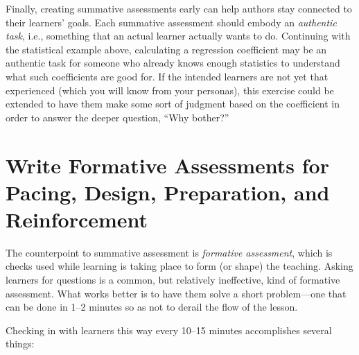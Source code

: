 \documentclass[10pt,letterpaper]{article}
\newcommand{\rulemajor}[1]{\section{#1}}
\begin{document}
Finally, creating summative assessments early can help authors stay connected to
their learners' goals.  Each summative assessment should embody an
\emph{authentic task}, i.e., something that an actual learner actually wants to
do.  Continuing with the statistical example above, calculating a regression
coefficient may be an authentic task for someone who already knows enough
statistics to understand what such coefficients are good for.  If the intended
learners are not yet that experienced (which you will know from your personas),
this exercise could be extended to have them make some sort of judgment based
on the coefficient in order to answer the deeper question, ``Why bother?''

\rulemajor{Write Formative Assessments for Pacing, Design, Preparation, and Reinforcement}

The counterpoint to summative assessment is \emph{formative assessment}, which is
checks used while learning is taking place to form (or shape) the teaching.
Asking learners for questions is a common, but relatively ineffective, kind of
formative assessment.  What works better is to have them solve a short
problem---one that can be done in 1--2 minutes so as not to derail the flow of
the lesson.

Checking in with learners this way every 10--15 minutes accomplishes several
things:
\end{document}
